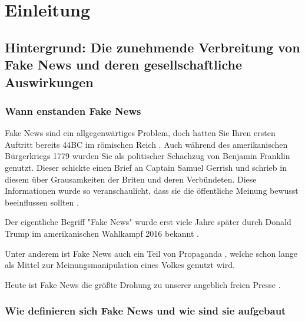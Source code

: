 \chapter{Einleitung}
\label{chap:einleitung}

\section{Hintergrund: Die zunehmende Verbreitung von Fake News und deren gesellschaftliche Auswirkungen}
\label{sec:hintergrund}



\subsection{Wann enstanden Fake News}

Fake News sind ein allgegenwärtiges Problem, doch hatten Sie Ihren ersten Auftritt bereits 44BC im römischen Reich \cite{socsci9100185}.
Auch während des amerikanischen Bürgerkriegs 1779 wurden Sie als politischer Schachzug von Benjamin Franklin genutzt.
Dieser schickte einen Brief an Captain Samuel Gerrish und schrieb in diesem über Grausamkeiten der Briten und deren Verbündeten. 
Diese Informationen wurde so veranschaulicht, dass sie die öffentliche Meinung bewusst beeinflussen sollten \cite{Sharma:2024}.

Der eigentliche Begriff "Fake News" wurde erst viele Jahre später durch Donald Trump im amerikanischen Wahlkampf 2016 bekannt \cite{Ashish2024}. 

Unter anderem ist Fake News auch ein Teil von Propaganda \cite{buerker2022fakenews}, welche schon lange als Mittel zur Meinungsmanipulation eines Volkes genutzt wird.

Heute ist Fake News die größte Drohung zu unserer angeblich freien Presse \cite{Sharma:2024}.

\subsection{Wie definieren sich Fake News und wie sind sie aufgebaut}

